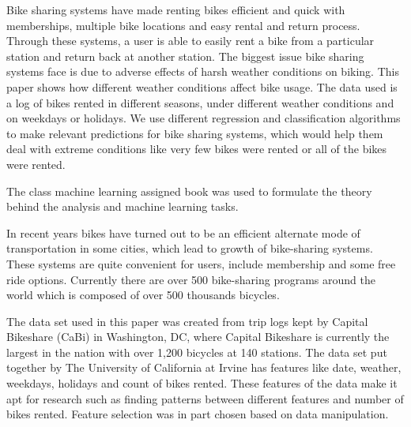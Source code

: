 \documentclass[12pt]{article}
\date{}
\author{\theauthor}
\newcommand{\ci}[1]{\cite{#1}}
\begin{document}
\maketitle
\thispagestyle{empty}
\newpage
\tableofcontents
\newpage


Bike sharing systems have made renting bikes efficient and quick with
memberships, multiple bike locations and easy rental and return
process. Through these systems, a user is able to easily rent a bike from a
particular station and return back at another station. The biggest issue bike
sharing systems face is due to adverse effects of harsh weather conditions on
biking. This paper shows how different weather conditions affect bike
usage. The data used is a log of bikes rented in different seasons, under
different weather conditions and on weekdays or holidays. We use different
regression and classification algorithms to make relevant predictions for bike
sharing systems, which would help them deal with extreme conditions like very
few bikes were rented or all of the bikes were rented.



The class machine learning assigned book\ci{murphy2012machine} was used to
formulate the theory behind the analysis and machine learning tasks.



In recent years bikes have turned out to be an efficient alternate mode of
transportation in some cities, which lead to growth of bike-sharing
systems. These systems are quite convenient for users, include membership and
some free ride options.  Currently there are over 500 bike-sharing programs
around the world which is composed of over 500 thousands
bicycles\ci{ucibikeshare}.

The data set used in this paper was created from trip logs kept by
Capital Bikeshare (CaBi) in Washington, DC, where Capital Bikeshare is
currently the largest in the nation with over 1,200 bicycles at 140
stations. The data set put together by The University of California at Irvine
has features like date, weather, weekdays, holidays and count of bikes
rented. These features of the data make it apt for research such as finding
patterns between different features and number of bikes rented.  Feature
selection was in part chosen based on data manipulation\ci{gebhart2013impact}.
\end{document}
